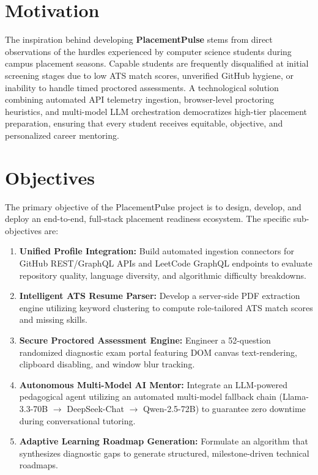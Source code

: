 \documentclass[12pt,a4paper]{report}
\begin{document}
\section{Motivation}
The inspiration behind developing \textbf{PlacementPulse} stems from direct observations of the hurdles experienced by computer science students during campus placement seasons. Capable students are frequently disqualified at initial screening stages due to low ATS match scores, unverified GitHub hygiene, or inability to handle timed proctored assessments. A technological solution combining automated API telemetry ingestion, browser-level proctoring heuristics, and multi-model LLM orchestration democratizes high-tier placement preparation, ensuring that every student receives equitable, objective, and personalized career mentoring.

\section{Objectives}
The primary objective of the PlacementPulse project is to design, develop, and deploy an end-to-end, full-stack placement readiness ecosystem. The specific sub-objectives are:
\begin{enumerate}
    \item \textbf{Unified Profile Integration:} Build automated ingestion connectors for GitHub REST/GraphQL APIs and LeetCode GraphQL endpoints to evaluate repository quality, language diversity, and algorithmic difficulty breakdowns.
    \item \textbf{Intelligent ATS Resume Parser:} Develop a server-side PDF extraction engine utilizing keyword clustering to compute role-tailored ATS match scores and missing skills.
    \item \textbf{Secure Proctored Assessment Engine:} Engineer a 52-question randomized diagnostic exam portal featuring DOM canvas text-rendering, clipboard disabling, and window blur tracking.
    \item \textbf{Autonomous Multi-Model AI Mentor:} Integrate an LLM-powered pedagogical agent utilizing an automated multi-model fallback chain (Llama-3.3-70B $\rightarrow$ DeepSeek-Chat $\rightarrow$ Qwen-2.5-72B) to guarantee zero downtime during conversational tutoring.
    \item \textbf{Adaptive Learning Roadmap Generation:} Formulate an algorithm that synthesizes diagnostic gaps to generate structured, milestone-driven technical roadmaps.
\end{enumerate}
\end{document}
